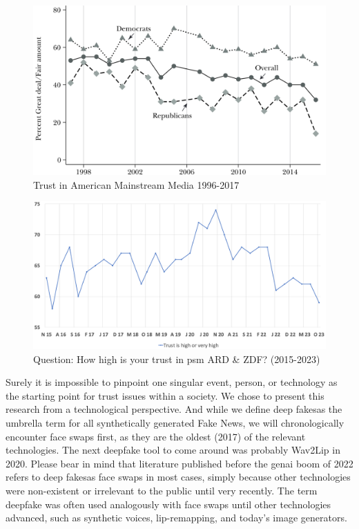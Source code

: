 \documentclass[
  a4paper,  %
  twoside,  %
  bibliography=totoc,
  headsepline,
  cleardoublepage=empty,
  parskip=half,
  draft=false
]{scrbook}
\begin{document}
\begin{figure}[h]
  \centering
  \centering
  \includegraphics[width=0.75\linewidth]{./graphics/images/trust-america mainstream.png}
  \caption{Trust in American Mainstream Media 1996-2017 \cite{allcottSocialMediaFake2017}}
  \label{fig:trust-us}
\end{figure}
\begin{figure}[h]
  \centering
  \includegraphics[width=0.8\linewidth]{./graphics/images/FGW-Trust-in-ARDZDF.png}
  \caption{Question: How high is your trust in \gls{psm} ARD \& ZDF? (2015-2023) \cite{zdf-politbarometerVertrauenGlaubwuerdigkeitBerichterstattung2023}}
  \label{fig:trust-ger}
\end{figure}
Surely it is impossible to pinpoint one singular event, person, or technology as the starting point for trust issues within a society. We chose to present this research from a technological perspective. And while we define deep fakesas the umbrella term for all synthetically generated Fake News, we will chronologically encounter face swaps first, as they are the oldest (2017) of the relevant technologies. The next deepfake tool to come around was probably Wav2Lip in 2020. Please bear in mind that literature published before the \gls{genai} boom of 2022 refers to deep fakesas face swaps in most cases, simply because other technologies were non-existent or irrelevant to the public until very recently. The term deepfake was often used analogously with face swaps until other technologies advanced, such as synthetic voices, lip-remapping, and today's image generators.
\end{document}
